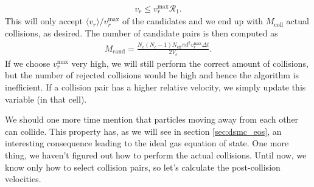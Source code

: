 \begin{align}
	v_r \leq v_r^\text{max}\mathcal{R}_1.
\end{align}
This will only accept $\langle v_r\rangle/v_r^\text{max}$ of the candidates and we end up with $M_\text{coll}$ actual collisions, as desired. The number of candidate pairs is then computed as
\begin{align}
	M_\text{cand} = \frac{N_c(N_c-1)N_\text{eff}\pi d^2v_r^\text{max} \Delta t}{2V_c}.
\end{align}
If we choose $v_r^\text{max}$ very high, we will still perform the correct amount of collisions, but the number of rejected collisions would be high and hence the algorithm is inefficient. If a collision pair has a higher relative velocity, we simply update this variable (in that cell).

We should one more time mention that particles moving away from each other can collide. This property has, as we will see in section \ref{sec:dsmc_eos}, an interesting consequence leading to the ideal gas equation of state. One more thing, we haven't figured out how to perform the actual collisions. Until now, we know only how to select collision pairs, so let's calculate the post-collision velocities.
